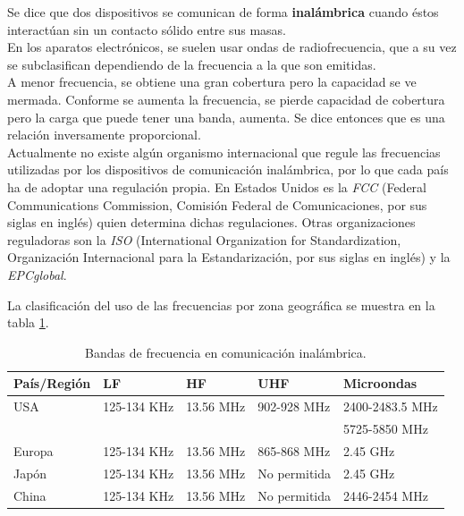 Se dice que dos dispositivos se comunican de forma \textbf{inalámbrica} cuando éstos interactúan sin un contacto sólido entre sus masas. \\

En los aparatos electrónicos, se suelen usar ondas de radiofrecuencia, que a su vez se subclasifican dependiendo de la frecuencia a la que son emitidas.\\

A menor frecuencia, se obtiene una gran cobertura pero la capacidad se ve mermada. Conforme se aumenta la frecuencia, se pierde capacidad de cobertura pero la carga que puede tener una banda, aumenta. Se dice entonces que es una relación inversamente proporcional.\\

Actualmente no existe algún organismo internacional que regule las frecuencias utilizadas por los dispositivos de comunicación inalámbrica, por lo que cada país ha de adoptar una regulación propia. En Estados Unidos es la \textit{FCC} (Federal Communications Commission, Comisión Federal de Comunicaciones, por sus siglas en inglés) quien determina dichas regulaciones. Otras organizaciones reguladoras son la \textit{ISO} (International Organization for Standardization, Organización Internacional para la Estandarización, por sus siglas en inglés) y la \textit{EPCglobal}.

La clasificación del uso de las frecuencias por zona geográfica se muestra en la tabla \ref{Tab:BandasFreq}.

\begin{table}[!htb]
\begin{center}
\caption{Bandas de frecuencia en comunicación inalámbrica.}
\label{Tab:BandasFreq}
\begin{tabular}{|l|l|l|l|l|}
	\hline
	\textbf{País/Región} & \textbf{LF} & \textbf{HF} & \textbf{UHF} & \textbf{Microondas}\\
	\hline
	USA & 125-134 KHz & 13.56 MHz & 902-928 MHz & 2400-2483.5 MHz\\& & & & 5725-5850 MHz \\
	\hline
	Europa & 125-134 KHz & 13.56 MHz & 865-868 MHz & 2.45 GHz \\
	\hline
	Japón & 125-134 KHz & 13.56 MHz & No permitida & 2.45 GHz \\
	\hline
	China & 125-134 KHz & 13.56 MHz & No permitida & 2446-2454 MHz \\
	\hline
\end{tabular}
\end{center}
\end{table}

